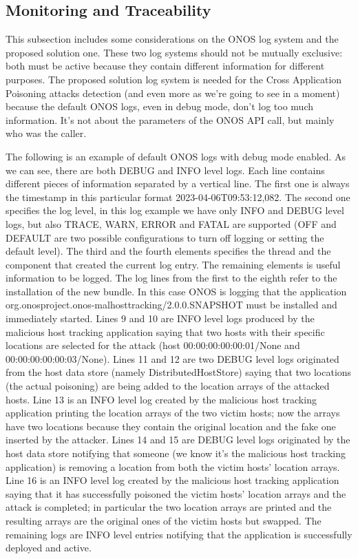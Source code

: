 \subsection{Monitoring and Traceability}
This subsection includes some considerations on the ONOS log system and the proposed solution one. These two log systems should not be mutually exclusive: both must be active because they contain different information for different purposes. The proposed solution log system is needed for the Cross Application Poisoning attacks detection (and even more as we're going to see in a moment) because the default ONOS logs, even in debug mode, don't log too much information. It's not about the parameters of the ONOS API call, but mainly who was the caller.
\medskip

The following is an example of default ONOS logs with debug mode enabled. As we can see, there are both DEBUG and INFO level logs. Each line contains different pieces of information separated by a vertical line. The first one is always the timestamp in this particular format 2023-04-06T09:53:12,082. The second one specifies the log level, in this log example we have only INFO and DEBUG level logs, but also TRACE, WARN, ERROR and FATAL are supported (OFF and DEFAULT are two possible configurations to turn off logging or setting the default level). The third and the fourth elements specifies the thread and the component that created the current log entry. The remaining elements is useful information to be logged. The log lines from the first to the eighth refer to the installation of the new bundle. In this case ONOS is logging that the application org.onosproject.onos-malhosttracking/2.0.0.SNAPSHOT must be installed and immediately started. Lines 9 and 10 are INFO level logs produced by the malicious host tracking application saying that two hosts with their specific locations are selected for the attack (host 00:00:00:00:00:01/None and 00:00:00:00:00:03/None). Lines 11 and 12 are two DEBUG level logs originated from the host data store (namely DistributedHostStore) saying that two locations (the actual poisoning) are being added to the location arrays of the attacked hosts. Line 13 is an INFO level log created by the malicious host tracking application printing the location arrays of the two victim hosts; now the arrays have two locations because they contain the original location and the fake one inserted by the attacker. Lines 14 and 15 are DEBUG level logs originated by the host data store notifying that someone (we know it's the malicious host tracking application) is removing a location from both the victim hosts' location arrays. Line 16 is an INFO level log created by the malicious host tracking application saying that it has successfully poisoned the victim hosts' location arrays and the attack is completed; in particular the two location arrays are printed and the resulting arrays are the original ones of the victim hosts but swapped. The remaining logs are INFO level entries notifying that the application is successfully deployed and active. 
